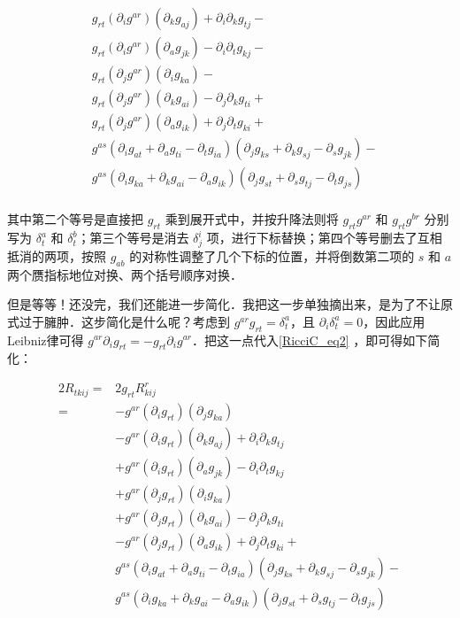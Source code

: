 \begin{equation}
\begin{aligned}
&g_{rt}(\partial_ig^{ar})(\partial_kg_{aj})+\partial_i\partial_kg_{tj}-\\
&g_{rt}(\partial_ig^{ar})(\partial_ag_{jk})-\partial_i\partial_tg_{kj}-\\%
&g_{rt}(\partial_jg^{ar})(\partial_ig_{ka})-\\
&g_{rt}(\partial_jg^{ar})(\partial_kg_{ai})-\partial_j\partial_kg_{ti}+\\
&g_{rt}(\partial_jg^{ar})(\partial_ag_{ik})+\partial_j\partial_tg_{ki}+\\%
&g^{as}(\partial_ig_{at}+\partial_ag_{ti}-\partial_tg_{ia})(\partial_jg_{ks}+\partial_kg_{sj}-\partial_sg_{jk})-\\
&g^{as}(\partial_ig_{ka}+\partial_kg_{ai}-\partial_ag_{ik})(\partial_jg_{st}+\partial_sg_{tj}-\partial_tg_{js})\\
\end{aligned}
\end{equation}

其中第二个等号是直接把 $g_{rt}$ 乘到展开式中，并按升降法则将 $g_{rt}g^{ar}$ 和 $g_{rt}g^{br}$ 分别写为 $\delta^a_t$ 和 $\delta^b_t$；第三个等号是消去 $\delta^i_j$ 项，进行下标替换；第四个等号删去了互相抵消的两项，按照 $g_{ab}$ 的对称性调整了几个下标的位置，并将倒数第二项的 $s$ 和 $a$ 两个赝指标地位对换、两个括号顺序对换．

但是等等！还没完，我们还能进一步简化．我把这一步单独摘出来，是为了不让原式过于臃肿．这步简化是什么呢？考虑到 $g^{ar}g_{rt}=\delta^a_t$，且 $\partial_i\delta^a_t=0$，因此应用Leibniz律可得 $g^{ar}\partial_ig_{rt}=-g_{rt}\partial_ig^{ar}$．把这一点代入\autoref{RicciC_eq2} ，即可得如下简化：

\begin{equation}\label{RicciC_eq3}
\begin{aligned}
2R_{tkij}={}&2g_{rt}R^r_{kij}\\
={}&-g^{ar}(\partial_ig_{rt})(\partial_jg_{ka})\\
&-g^{ar}(\partial_ig_{rt})(\partial_kg_{aj})+\partial_i\partial_kg_{tj}\\
&+g^{ar}(\partial_ig_{rt})(\partial_ag_{jk})-\partial_i\partial_tg_{kj}\\%
&+g^{ar}(\partial_jg_{rt})(\partial_ig_{ka})\\
&+g^{ar}(\partial_jg_{rt})(\partial_kg_{ai})-\partial_j\partial_kg_{ti}\\
&-g^{ar}(\partial_jg_{rt})(\partial_ag_{ik})+\partial_j\partial_tg_{ki}+\\%
&g^{as}(\partial_ig_{at}+\partial_ag_{ti}-\partial_tg_{ia})(\partial_jg_{ks}+\partial_kg_{sj}-\partial_sg_{jk})-\\
&g^{as}(\partial_ig_{ka}+\partial_kg_{ai}-\partial_ag_{ik})(\partial_jg_{st}+\partial_sg_{tj}-\partial_tg_{js})\\
\end{aligned}
\end{equation}



